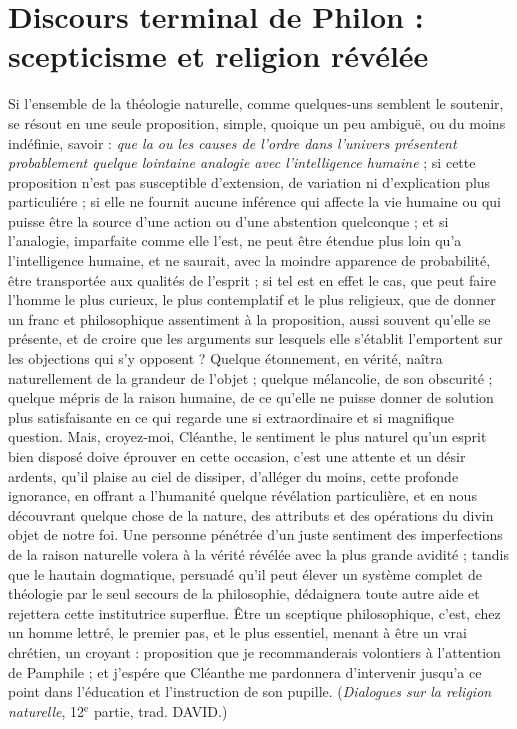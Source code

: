 
\section{Discours terminal de Philon : scepticisme et religion révélée}
%
Si l'ensemble de la théologie naturelle, comme quelques-uns
semblent le soutenir, se résout en une seule proposition,
simple, quoique un peu ambiguë, ou du moins indéfinie,
savoir : {\it que la ou les causes de l'ordre dans l'univers
présentent probablement quelque lointaine analogie avec
l'intelligence humaine} ; si cette proposition n’est pas
susceptible d’extension, de variation ni d’explication
plus particuliére ; si elle ne fournit aucune inférence qui
affecte la vie humaine ou qui puisse être la source d’une
action ou d’une abstention quelconque ; et si l’analogie,
imparfaite comme elle l’est, ne peut être étendue plus
loin qu’a l’intelligence humaine, et ne saurait, avec la
moindre apparence de probabilité, être transportée aux
qualités de l’esprit ; si tel est en effet le cas, que peut faire
l’homme le plus curieux, le plus contemplatif et le plus
religieux, que de donner un franc et philosophique assentiment
à la proposition, aussi souvent qu’elle se présente,
et de croire que les arguments sur lesquels elle s’établit
l'emportent sur les objections qui s’y opposent ? Quelque
étonnement, en vérité, naîtra naturellement de la grandeur
de l’objet ; quelque mélancolie, de son obscurité ; quelque
mépris de la raison humaine, de ce qu’elle ne puisse donner
de solution plus satisfaisante en ce qui regarde une si
extraordinaire et si magnifique question. Mais, croyez-moi,
Cléanthe, le sentiment le plus naturel qu’un esprit
bien disposé doive éprouver en cette occasion, c’est une
attente et un désir ardents, qu’il plaise au ciel de dissiper,
d’alléger du moins, cette profonde ignorance, en offrant
a l'humanité quelque révélation particulière, et en nous
découvrant quelque chose de la nature, des attributs et
des opérations du divin objet de notre foi. Une personne
pénétrée d’un juste sentiment des imperfections de la
raison naturelle volera à la vérité révélée avec la plus
grande avidité ; tandis que le hautain dogmatique, persuadé
qu’il peut élever un système complet de théologie
par le seul secours de la philosophie, dédaignera toute
autre aide et rejettera cette institutrice superflue. \^Etre
un sceptique philosophique, c’est, chez un homme lettré,
le premier pas, et le plus essentiel, menant à être un vrai
chrétien, un croyant : proposition que je recommanderais
volontiers à l'attention de Pamphile ; et j’espére que
Cléanthe me pardonnera d’intervenir jusqu’a ce point
dans l’éducation et l’instruction de son pupille. ({\it Dialogues
sur la religion naturelle}, 12$^\text{e}$ partie, trad. D{\footnotesize AVID}.)
